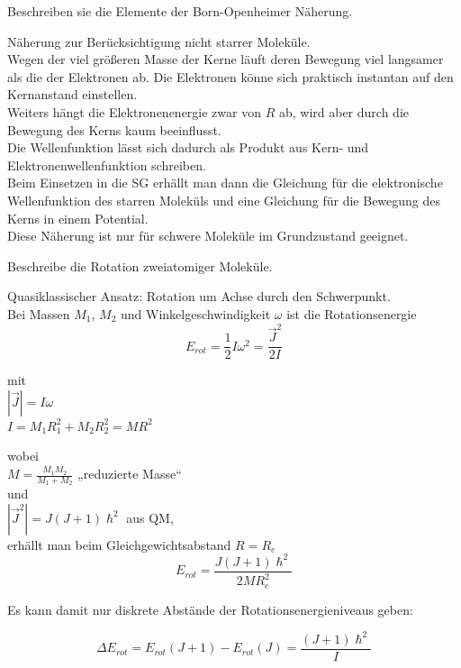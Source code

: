 \documentclass[a5paper,12pt,ngerman,grid=front %
,print
]{kartei}
\begin{document}
	\begin{karte}{
		Beschreiben sie die Elemente der Born-Openheimer Näherung.
		}
		
		Näherung zur Berücksichtigung nicht starrer Moleküle. \\
		
		Wegen der viel größeren Masse der Kerne läuft deren Bewegung viel langsamer als die der Elektronen ab. Die Elektronen könne sich praktisch instantan auf den Kernanstand einstellen.\\
		
		Weiters hängt die Elektronenenergie zwar von $R$ ab, wird aber durch die Bewegung des Kerns kaum beeinflusst. \\
		
		Die Wellenfunktion lässt sich dadurch als Produkt aus Kern- und Elektronenwellenfunktion schreiben. \\
		
		Beim Einsetzen in die SG erhällt man dann die Gleichung für die elektronische Wellenfunktion des starren Moleküls und eine Gleichung für die Bewegung des Kerns in einem Potential. \\
		
		Diese Näherung ist nur für schwere Moleküle im Grundzustand geeignet.
		
		
	\end{karte}


	\begin{karte}{
		Beschreibe die Rotation zweiatomiger Moleküle.
		}
		
		Quasiklassischer Ansatz: Rotation um Achse durch den Schwerpunkt. \\
		Bei Massen $M_1$, $M_2$ und Winkelgeschwindigkeit $\omega$ ist die Rotationsenergie 
		$$E_{rot} = \frac{1}{2} I \omega^2 = \frac{\vec{J}^2}{2 I}$$
		
		mit \\
		$ |\vec{J}|=I \omega  $ \\
		$ I = M_1 R_1^2 + M_2 R_2^2 = M R^2 $
		
		wobei \\
		$ M = \frac{M_1 M_2}{M_1 + M_2} $ „reduzierte Masse“ \\
		und \\
		$ |\vec{J}^2| = J(J+1){\hslash}^2 $ aus QM, \\
		erhällt man beim Gleichgewichtsabstand $ R = R_e $ \\
		
		$$ E_{rot} = \frac{J(J+1)\hslash^2}{2 M R_e^2}  $$
		
		Es kann damit nur diskrete Abstände der Rotationsenergieniveaus geben:
		
		$$       \Delta E_{rot} = E_{rot} (J+1) - E_{rot} (J) = \frac{( J+1 ) \hslash^2 }{ I }       $$
		
	\end{karte}
\end{document}
